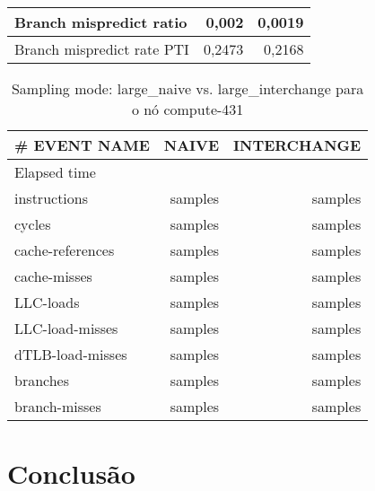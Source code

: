 \documentclass[conference,compsoc]{IEEEtran}
\begin{document}
\begin{table}[H]
\begin{tabular}{ | l | r | r |   }
  Branch mispredict ratio	 & 0,002   &     0,0019  \\ \hline      

  
  Branch mispredict rate PTI	 &  0,2473   &   0,2168    \\ \hline          
   
     \end{tabular}
  \end{table}
  
  



 \begin{table}[H]
  \caption{Sampling mode: large\_naive vs. large\_interchange
 para o nó compute-431}
  \label{table:search_sampling}
  \centering
  \begin{tabular}{ | l | r | r |   }

  \hline
  \# EVENT NAME	 & NAIVE  & INTERCHANGE \\ \hline   
  Elapsed time & &  \\ \hline    
  instructions	& samples &  samples \\ \hline    
cycles	& samples &  samples \\ \hline    
cache-references	& samples &  samples \\ \hline    
cache-misses	& samples &  samples \\ \hline    
LLC-loads	& samples &  samples \\ \hline    
LLC-load-misses	& samples &  samples \\ \hline    
dTLB-load-misses	& samples &  samples \\ \hline    
branches	& samples &  samples \\ \hline    
branch-misses	& samples &  samples \\ \hline    

   \end{tabular}
  \end{table}



  \section{Conclusão}
\end{document}
